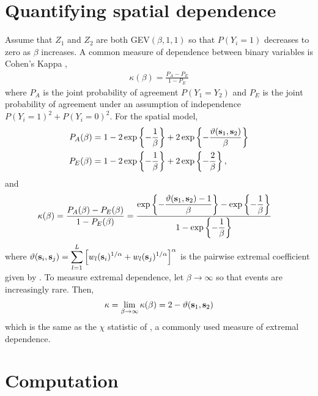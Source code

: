 \section{Quantifying spatial dependence} \label{rbs:spatdep}

Assume that $Z_1$ and $Z_2$ are both GEV$(\beta, 1, 1)$ so that $P(Y_i = 1)$ decreases to zero as $\beta$ increases.
A common measure of dependence between binary variables is Cohen's Kappa \citep{Cohen1960},
\begin{align}
\kappa(\beta) = \frac{P_A - P_E}{1 - P_E}
\end{align}
where $P_A$ is the joint probability of agreement $P(Y_1 = Y_2)$ and $P_E$ is the joint probability of agreement under an assumption of independence $P(Y_i = 1)^2 + P(Y_i = 0)^2$.
For the spatial model,
\begin{align*}
P_A(\beta) &= 1 - 2 \exp\left\{ -\frac{1}{\beta} \right\} + 2 \exp\left\{-\frac{\vartheta(\mathbf{s}_1, \mathbf{s}_2)}{\beta}  \right\} \nonumber \\
P_E(\beta) &= 1 - 2 \exp \left\{ -\frac{1}{\beta} \right\} + 2 \exp \left\{ -\frac{2}{\beta} \right\}, \nonumber
\end{align*}
and
\begin{align} \label{rbeq:kappa}
\kappa(\beta) &= \frac{P_A(\beta) - P_E(\beta)}{1 - P_E(\beta)} = \frac{\exp\left\{-\displaystyle\frac{\vartheta(\mathbf{s}_1, \mathbf{s}_2) - 1}{\beta}  \right\} - \exp \left\{ -\displaystyle\frac{1}{\beta} \right\}}{1 - \exp \left\{ -\displaystyle\frac{1}{\beta} \right\}}
\end{align}
where $\vartheta (\mathbf{s}_i, \mathbf{s}_j) = \displaystyle \sum_{ l = 1 }^{ L } \left[ w_{l}(\mathbf{s}_i)^{ 1/\alpha } +  w_{ l}(\mathbf{s}_j)^{ 1/\alpha } \right]^\alpha$ is the pairwise extremal coefficient given by \citet{Reich2012}.
To measure extremal dependence, let $\beta \rightarrow \infty$ so that events are increasingly rare.
Then,
\begin{align}
\kappa = \lim_{\beta \rightarrow \infty} \kappa(\beta) = 2 - \vartheta(\mathbf{s}_1, \mathbf{s}_2)
\end{align}
which is the same as the $\chi$ statistic of \citet{Coles2001}, a commonly used measure of extremal dependence.

\section{Computation}\label{rbs:comp}

